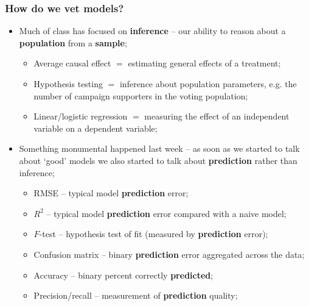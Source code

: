 \documentclass[aspectratio=169]{beamer}
\theoremstyle{principle}
\begin{document}
\begin{frame}
\frametitle{How do we vet models?}

\begin{itemize}
\item Much of class has focused on \textbf{inference} -- our ability to reason about a \textbf{population} from a \textbf{sample};
\begin{itemize}
\item Average causal effect $=$ estimating general effects of a treatment;
\item Hypothesis testing $=$ inference about population parameters, e.g. the number of campaign supporters in the voting population;
\item Linear/logistic regression $=$ measuring the effect of an independent variable on a dependent variable;
\end{itemize}
\bigskip

\item Something monumental happened last week -- as soon as we started to talk about `good' models we also started to talk about \textbf{prediction} rather than inference;
\begin{itemize}
\item RMSE -- typical model \textbf{prediction} error;
\item $R^2$ -- typical model \textbf{prediction} error compared with a naive model;
\item $F$-test -- hypothesis test of fit (measured by \textbf{prediction} error);
\item Confusion matrix -- binary \textbf{prediction} error aggregated across the data;
\item Accuracy -- binary percent correctly \textbf{predicted};
\item Precision/recall -- measurement of \textbf{prediction} quality;
\end{itemize}
\end{itemize}
\end{frame}
\end{document}
